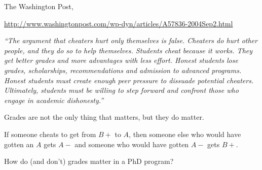 \documentclass[12pt]{beamer}
\newcommand\gap{\vspace{5mm}}
\begin{document}
\begin{frame}

The Washington Post,

\url{http://www.washingtonpost.com/wp-dyn/articles/A57836-2004Sep2.html}

{\it
``The argument that cheaters hurt only themselves is false. Cheaters do hurt other people, and they do so to help themselves. Students cheat because it works. They get better grades and more advantages with less effort. Honest students lose grades, scholarships, recommendations and admission to advanced programs. Honest students must create enough peer pressure to dissuade potential cheaters. Ultimately, students must be willing to step forward and confront those who engage in academic dishonesty.''
}

\end{frame}
\begin{frame}

Grades are not the only thing that matters, but they do matter.

If someone cheats to get from $B+$ to $A$, then someone else who would have gotten an $A$ gets $A-$ and someone who would have gotten $A-$ gets $B+$.

\gap

How do (and don't) grades matter in a PhD program?

\end{frame}
\end{document}
